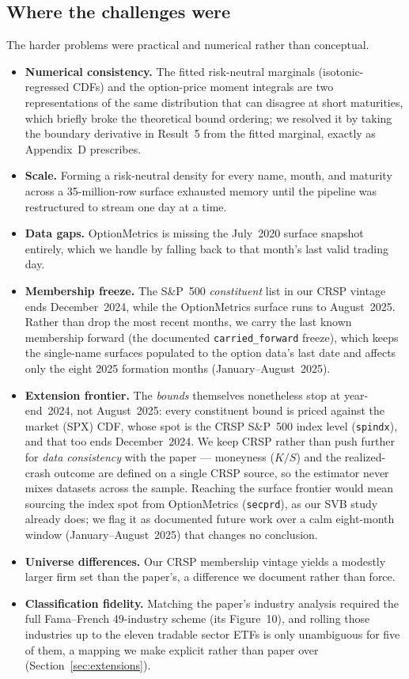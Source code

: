 \documentclass[12pt]{article}
\begin{document}
\subsection{Where the challenges were}
The harder problems were practical and numerical rather than conceptual.
\begin{itemize}
  \item \textbf{Numerical consistency.} The fitted risk-neutral marginals
    (isotonic-regressed CDFs) and the option-price moment integrals are two
    representations of the same distribution that can disagree at short maturities,
    which briefly broke the theoretical bound ordering; we resolved it by taking the
    boundary derivative in Result~5 from the fitted marginal, exactly as Appendix~D
    prescribes.
  \item \textbf{Scale.} Forming a risk-neutral density for every name, month, and
    maturity across a 35-million-row surface exhausted memory until the pipeline was
    restructured to stream one day at a time.
  \item \textbf{Data gaps.} OptionMetrics is missing the July~2020 surface snapshot
    entirely, which we handle by falling back to that month's last valid trading day.
  \item \textbf{Membership freeze.} The S\&P~500 \emph{constituent} list in our CRSP
    vintage ends December~2024, while the OptionMetrics surface runs to August~2025.
    Rather than drop the most recent months, we carry the last known membership
    forward (the documented \texttt{carried\_forward} freeze), which keeps the
    single-name surfaces populated to the option data's last date and affects only
    the eight 2025 formation months (January--August~2025).
  \item \textbf{Extension frontier.} The \emph{bounds} themselves nonetheless stop at
    year-end~2024, not August~2025: every constituent bound is priced against the
    market (SPX) CDF, whose spot is the CRSP S\&P~500 index level (\texttt{spindx}),
    and that too ends December~2024. We keep CRSP rather than push further for
    \emph{data consistency} with the paper --- moneyness ($K/S$) and the
    realized-crash outcome are defined on a single CRSP source, so the estimator
    never mixes datasets across the sample. Reaching the surface frontier would mean
    sourcing the index spot from OptionMetrics (\texttt{secprd}), as our SVB study
    already does; we flag it as documented future work over a calm eight-month
    window (January--August~2025) that changes no conclusion.
  \item \textbf{Universe differences.} Our CRSP membership vintage yields a modestly
    larger firm set than the paper's, a difference we document rather than force.
  \item \textbf{Classification fidelity.} Matching the paper's industry analysis
    required the full Fama--French 49-industry scheme (its Figure~10), and rolling
    those industries up to the eleven tradable sector ETFs is only unambiguous for
    five of them, a mapping we make explicit rather than paper over
    (Section~\ref{sec:extensions}).
\end{itemize}
\end{document}
